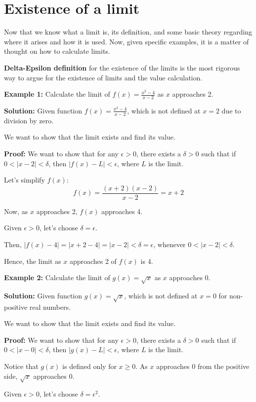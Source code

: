 \section{Existence of a limit}

Now that we know what a limit is, its definition, and some basic theory regarding where it arises and how it is used. Now, given specific examples, it is a matter of thought on how to calculate limits. 


\textbf{Delta-Epsilon definition} for the existence of the limits is the most rigorous way to argue for the existence of limits and the value calculation. 


\textbf{Example 1:}
Calculate the limit of $f(x) = \frac{x^2 - 4}{x - 2}$ as $x$ approaches 2.

\textbf{Solution:}
Given function $f(x) = \frac{x^2 - 4}{x - 2}$, which is not defined at $x = 2$ due to division by zero.

We want to show that the limit exists and find its value.

\textbf{Proof:} 
We want to show that for any $\epsilon > 0$, there exists a $\delta > 0$ such that if $0 < |x - 2| < \delta$, then $|f(x) - L| < \epsilon$, where $L$ is the limit.

Let's simplify $f(x)$:
\[
f(x) = \frac{(x+2)(x-2)}{x-2} = x + 2
\]

Now, as $x$ approaches 2, $f(x)$ approaches 4.

Given $\epsilon > 0$, let's choose $\delta = \epsilon$.

Then, $|f(x) - 4| = |x + 2 - 4| = |x - 2| < \delta = \epsilon$, whenever $0 < |x - 2| < \delta$.

Hence, the limit as $x$ approaches 2 of $f(x)$ is 4.

\textbf{Example 2:}
Calculate the limit of $g(x) = \sqrt{x}$ as $x$ approaches 0.

\textbf{Solution:}
Given function $g(x) = \sqrt{x}$, which is not defined at $x = 0$ for non-positive real numbers.

We want to show that the limit exists and find its value.

\textbf{Proof:} 
We want to show that for any $\epsilon > 0$, there exists a $\delta > 0$ such that if $0 < |x - 0| < \delta$, then $|g(x) - L| < \epsilon$, where $L$ is the limit.

Notice that $g(x)$ is defined only for $x \geq 0$. As $x$ approaches 0 from the positive side, $\sqrt{x}$ approaches 0.

Given $\epsilon > 0$, let's choose $\delta = \epsilon^2$.

